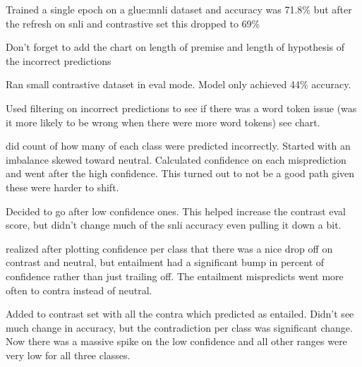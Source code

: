\documentclass[11pt]{article}
\begin{document}
Trained a single epoch on a glue:mnli dataset and accuracy was 71.8\%  but after the refresh on snli and contrastive set this dropped to 69\%

Don't forget to add the chart on length of premise and length of hypothesis of the incorrect predictions

Ran small contrastive dataset in eval mode. Model only achieved 44\% accuracy.

Used filtering on incorrect predictions to see if there was a word token issue (was it more likely to be wrong when there were more word tokens) see chart.  

did count of how many of each class were predicted incorrectly. Started with an imbalance skewed toward neutral. Calculated confidence on each misprediction and went after the high confidence. This turned out to not be a good path given these were harder to shift.

Decided to go after low confidence ones. This helped increase the contrast eval score, but didn't change much of the snli accuracy even pulling it down a bit.

realized after plotting confidence per class that there was a nice drop off on contrast and neutral, but entailment had a significant bump in percent of confidence rather than just trailing off. The entailment mispredicts went more often to contra instead of neutral.

Added to contrast set with all the contra which predicted as entailed. Didn't see much change in accuracy, but the contradiction per class was significant change. Now there was a massive spike on the low confidence and all other ranges were very low for all three classes.
\end{document}
